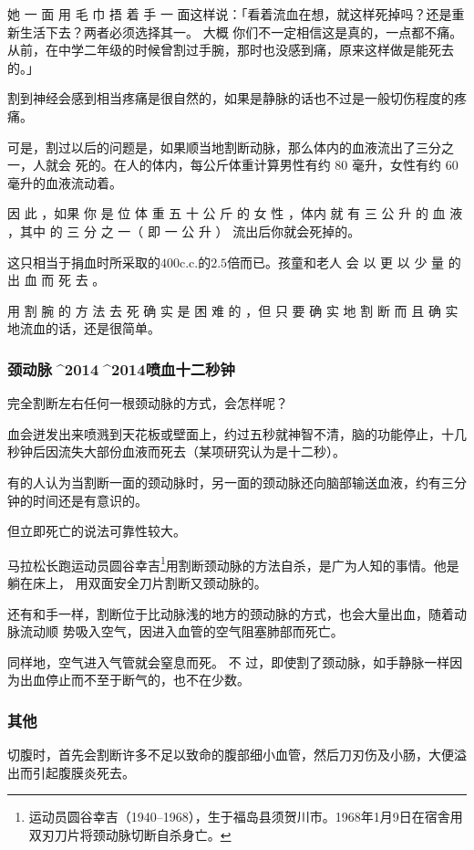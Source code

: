 \documentclass[UTF8]{ctexart}
\begin{document}
她 一 面 用 毛 巾 捂 着 手 一 面这样说：「看着流血在想，就这样死掉吗？还是重新生活下去？两者必须选择其一。
大概 你们不一定相信这是真的，一点都不痛。从前，在中学二年级的时候曾割过手腕，那时也没感到痛，原来这样做是能死去的。」 

割到神经会感到相当疼痛是很自然的，如果是静脉的话也不过是一般切伤程度的疼痛。

可是，割过以后的问题是，如果顺当地割断动脉，那么体内的血液流出了三分之一，人就会 死的。在人的体内，每公斤体重计算男性有约 $80$ 毫升，女性有约 $60$ 毫升的血液流动着。

因 此 ，如果 你 是 位 体 重 五 十 公 斤 的 女 性 ，体内 就 有 三 公 升 的 血 液 ，其中 的 三 分 之 一（ 即 一 公 升 ） 流出后你就会死掉的。

这只相当于捐血时所采取的$400$c.c.的$2.5$倍而已。孩童和老人 会 以 更 以 少 量 的 出 血 而 死 去 。

用 割 腕 的 方 法 去 死 确 实 是 困 难 的 ，但 只 要 确 实 地 割 断 而 且 确 实 地流血的话，还是很简单。

\subsubsection{颈动脉^^^^2014^^^^2014喷血十二秒钟}

完全割断左右任何一根颈动脉的方式，会怎样呢？

血会迸发出来喷溅到天花板或壁面上，约过五秒就神智不清，脑的功能停止，十几秒钟后因流失大部份血液而死去（某项研究认为是十二秒）。

有的人认为当割断一面的颈动脉时，另一面的颈动脉还向脑部输送血液，约有三分钟的时间还是有意识的。

但立即死亡的说法可靠性较大。

马拉松长跑运动员圆谷幸吉\footnote{运动员圆谷幸吉（1940–1968），生于福岛县须贺川市。1968年1月9日在宿舎用双刃刀片将颈动脉切断自杀身亡。}用割断颈动脉的方法自杀，是广为人知的事情。他是躺在床上， 用双面安全刀片割断又颈动脉的。

还有和手一样，割断位于比动脉浅的地方的颈动脉的方式，也会大量出血，随着动脉流动顺 势吸入空气，因进入血管的空气阻塞肺部而死亡。

同样地，空气进入气管就会窒息而死。
不 过，即使割了颈动脉，如手静脉一样因为出血停止而不至于断气的，也不在少数。

\subsubsection{其他}

切腹时，首先会割断许多不足以致命的腹部细小血管，然后刀刃伤及小肠，大便溢出而引起腹膜炎死去。
\end{document}
